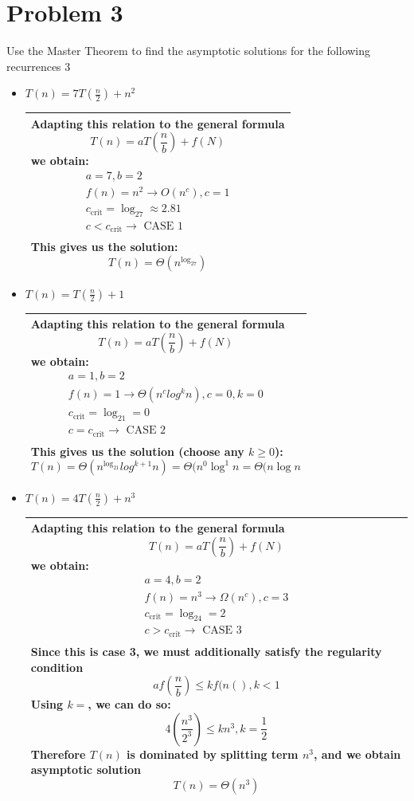 \documentclass[10pt]{article}
\newenvironment{answer}
    {\begin{center}
    \begin{tabular}{|p{1\textwidth}|}
    \hline
    }
    { 
    \\\hline
    \end{tabular} 
    \end{center}
    }
\begin{document}
\section*{Problem 3}
Use the Master Theorem to find the asymptotic solutions for the following recurrences
3
\begin{itemize}
\item $T(n) = 7T(\frac{n}{2}) + n^2$
  \begin{answer}
    Adapting this relation to the general formula
    \[ T(n) = aT\left(\frac{n}{b}\right) + f(N) \]
    we obtain: 
    \begin{gather*}
     a = 7, b = 2 \\
     f(n) = n^2 \rightarrow O(n^c), c = 1\\
     c_{\textrm{crit}} = \log_27 \approx 2.81 \\
     c < c_{\textrm{crit}} \rightarrow \textrm{ CASE 1} \\
   \end{gather*}
   This gives us the solution:
   \[ T(n) = \Theta(n^{\log_27}) \]
  \end{answer}

\item $T(n) = T (\frac{n}{2}) + 1$
    \begin{answer}
    Adapting this relation to the general formula
    \[ T(n) = aT\left(\frac{n}{b}\right) + f(N) \]
    we obtain: 
    \begin{gather*}
     a = 1, b = 2 \\
     f(n) = 1 \rightarrow \Theta(n^clog^kn), c = 0, k = 0\\
     c_{\textrm{crit}} = \log_21 = 0 \\
     c = c_{\textrm{crit}} \rightarrow \textrm{ CASE 2} \\
   \end{gather*}
   This gives us the solution (choose any $k \ge 0$):
   \[ T(n) = \Theta(n^{\log_21}log^{k+1}n) = \Theta(n^0\log^1n = \Theta(n\log n\]
  \end{answer}
\newpage
\item $T(n) = 4T(\frac{n}{2}) + n^3$
  \begin{answer}
    Adapting this relation to the general formula
    \[ T(n) = aT\left(\frac{n}{b}\right) + f(N) \]
    we obtain: 
    \begin{gather*}
     a = 4, b = 2 \\
     f(n) = n^3 \rightarrow \Omega(n^c), c = 3 \\
     c_{\textrm{crit}} = \log_24 = 2 \\
     c > c_{\textrm{crit}} \rightarrow \textrm{ CASE 3} \\
   \end{gather*}
   Since this is case 3, we must additionally satisfy the regularity condition
   \[ af\left(\frac{n}{b}\right) \le kf(n() , k < 1\]
   Using $k = $, we can do so:
   \[ 4\left(\frac{n^3}{2^3}\right) \le kn^3, k = \frac{1}{2} \]
   Therefore $T(n)$ is dominated by splitting term $n^3$, and we obtain asymptotic solution
   \[ T(n) = \Theta(n^3) \]
  \end{answer}
\end{itemize}
\end{document}
